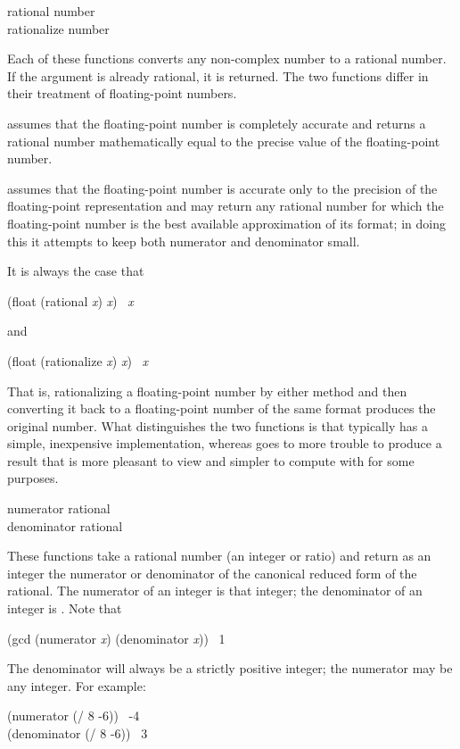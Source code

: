 \begin{defun}[Function]
rational number \\
rationalize number

Each of these functions converts any non-complex number to a rational
number.  If the argument is already rational, it is returned.
The two functions differ in their treatment of floating-point numbers.

 assumes that the floating-point number is completely accurate
and returns a rational number mathematically equal to the precise
value of the floating-point number.

 assumes that the
floating-point number is accurate only to the precision of the
floating-point representation and may return any rational number for
which the floating-point number is the best available approximation of
its format; in doing this it attempts to keep both numerator and
denominator small.

It is always the case that
\begin{lisp}
(float (rational \emph{x}) \emph{x}) \EQ\ \emph{x}
\end{lisp}
and
\begin{lisp}
(float (rationalize \emph{x}) \emph{x}) \EQ\ \emph{x}
\end{lisp}
That is, rationalizing a floating-point number by either method
and then converting it back
to a floating-point number of the same format produces the original number.
What distinguishes the two functions is that  typically
has a simple, inexpensive implementation, whereas  goes
to more trouble to produce a result that is more pleasant to view and
simpler to compute with for some purposes.
\end{defun}

\begin{defun}[Function]
numerator rational \\
denominator rational

These functions take a rational number (an integer or ratio)
and return as an integer the numerator or denominator of the canonical
reduced form of the rational.  The numerator of an integer is that integer;
the denominator of an integer is .  Note that
\begin{lisp}
(gcd (numerator \emph{x}) (denominator \emph{x})) \EV\ 1
\end{lisp}
The denominator will always be a strictly positive integer;
the numerator may be any integer.
For example:
\begin{lisp}
(numerator (/ 8 -6)) \EV\ -4 \\
(denominator (/ 8 -6)) \EV\ 3
\end{lisp}
\end{defun}

